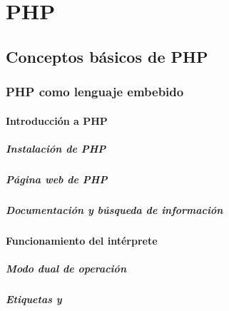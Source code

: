 \documentclass[a4paper,11pt,spanish]{sphinxmanual}
\begin{document}
\part{PHP}
\label{\detokenize{php:php}}\label{\detokenize{php::doc}}

\chapter{Conceptos básicos de PHP}
\label{\detokenize{php:conceptos-basicos-de-php}}

\section{PHP como lenguaje embebido}
\label{\detokenize{php:php-como-lenguaje-embebido}}

\subsection{Introducción a PHP}
\label{\detokenize{php:introduccion-a-php}}

\subsubsection{Instalación de PHP}
\label{\detokenize{php:instalacion-de-php}}

\subsubsection{Página web de PHP}
\label{\detokenize{php:pagina-web-de-php}}

\subsubsection{Documentación y búsqueda de información}
\label{\detokenize{php:documentacion-y-busqueda-de-informacion}}

\subsection{Funcionamiento del intérprete}
\label{\detokenize{php:funcionamiento-del-interprete}}

\subsubsection{Modo dual de operación}
\label{\detokenize{php:modo-dual-de-operacion}}

\subsubsection{Etiquetas  y }
\label{\detokenize{php:etiquetas-php-y}}
\end{document}
